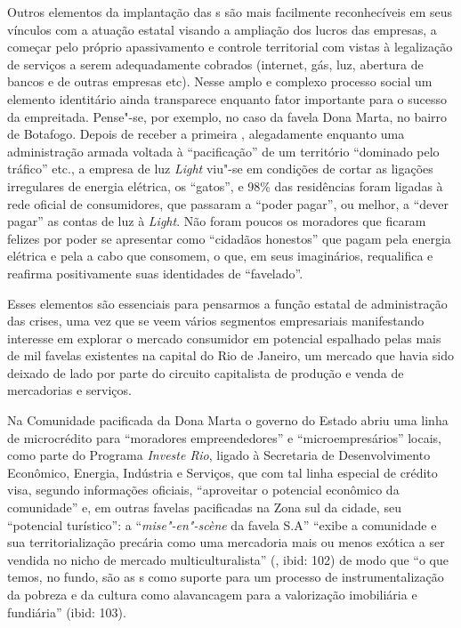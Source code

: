 Outros elementos da implantação das s são mais facilmente
reconhecíveis em seus vínculos com a atuação estatal visando a ampliação
dos lucros das empresas, a começar pelo próprio apassivamento e controle
territorial com vistas à legalização de serviços a serem adequadamente
cobrados (internet, gás, luz, abertura de bancos e de outras empresas
etc). Nesse amplo e complexo processo social um elemento identitário
ainda transparece enquanto fator importante para o sucesso da
empreitada. Pense"-se, por exemplo, no caso da favela Dona Marta, no
bairro de Botafogo. Depois de receber a primeira , alegadamente
enquanto uma administração armada voltada à ``pacificação'' de um
território ``dominado pelo tráfico'' etc., a empresa de luz \emph{Light}
viu"-se em condições de cortar as ligações irregulares de energia
elétrica, os ``gatos'', e 98\% das residências foram ligadas à rede
oficial de consumidores, que passaram a ``poder pagar'', ou melhor, a
``dever pagar'' as contas de luz à \emph{Light}. Não foram poucos os
moradores que ficaram felizes por poder se apresentar como ``cidadãos
honestos'' que pagam pela energia elétrica e pela  a cabo que
consomem, o que, em seus imaginários, requalifica e reafirma
positivamente suas identidades de ``favelado''.

Esses elementos são essenciais para pensarmos a função estatal de
administração das crises, uma vez que se veem vários segmentos
empresariais manifestando interesse em explorar o mercado consumidor em
potencial espalhado pelas mais de mil favelas existentes na capital do
Rio de Janeiro, um mercado que havia sido deixado de lado por parte do
circuito capitalista de produção e venda de mercadorias e serviços.

Na Comunidade pacificada da Dona Marta o governo do Estado abriu uma
linha de microcrédito para ``moradores empreendedores'' e
``microempresários'' locais, como parte do Programa \emph{Investe Rio},
ligado à Secretaria de Desenvolvimento Econômico, Energia, Indústria e
Serviços, que com tal linha especial de crédito visa, segundo
informações oficiais, ``aproveitar o potencial econômico da comunidade''
e, em outras favelas pacificadas na Zona sul da cidade, seu ``potencial
turístico'': a ``\emph{mise"-en"-scène} da favela S.A'' ``exibe a
comunidade e sua territorialização precária como uma mercadoria mais ou
menos exótica a ser vendida no nicho de mercado multiculturalista''
(, ibid: 102) de modo que ``o que temos, no fundo, são as s como
suporte para um processo de instrumentalização da pobreza e da cultura
como alavancagem para a valorização imobiliária e fundiária'' (ibid:
103).

